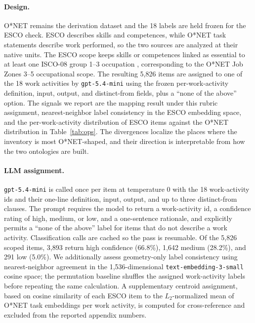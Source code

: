 \documentclass[10pt]{article}
\begin{document}
\paragraph{Design.}
O{*}NET remains the derivation dataset and the 18 labels are held frozen for the ESCO check. ESCO describes skills and competences, while O{*}NET task statements describe work performed, so the two sources are analyzed at their native units. The ESCO scope keeps skills or competences linked as essential to at least one ISCO-08 group 1--3 occupation \citep{ilo2012isco08}, corresponding to the O{*}NET Job Zones 3--5 occupational scope.
The resulting 5{,}826 items are assigned to one of the 18 work activities by \texttt{gpt-5.4-mini} using the frozen per-work-activity definition, input, output, and distinct-from fields, plus a ``none of the above'' option.
The signals we report are the mapping result under this rubric assignment, nearest-neighbor label consistency in the ESCO embedding space, and the per-work-activity distribution of ESCO items against the O{*}NET distribution in Table~\ref{tab:ops}.
The divergences localize the places where the inventory is most O{*}NET-shaped, and their direction is interpretable from how the two ontologies are built.

\paragraph{LLM assignment.}
\texttt{gpt-5.4-mini} is called once per item at temperature 0 with the 18 work-activity ids and their one-line definition, input, output, and up to three distinct-from clauses.
The prompt requires the model to return a work-activity id, a confidence rating of high, medium, or low, and a one-sentence rationale, and explicitly permits a ``none of the above'' label for items that do not describe a work activity.
Classification calls are cached so the pass is resumable.
Of the 5{,}826 scoped items, 3{,}893 return high confidence (66.8\%), 1{,}642 medium (28.2\%), and 291 low (5.0\%).
We additionally assess geometry-only label consistency using nearest-neighbor agreement in the 1{,}536-dimensional \texttt{text-embedding-3-small} cosine space; the permutation baseline shuffles the assigned work-activity labels before repeating the same calculation.
A supplementary centroid assignment, based on cosine similarity of each ESCO item to the $L_{2}$-normalized mean of O{*}NET task embeddings per work activity, is computed for cross-reference and excluded from the reported appendix numbers.
\end{document}
